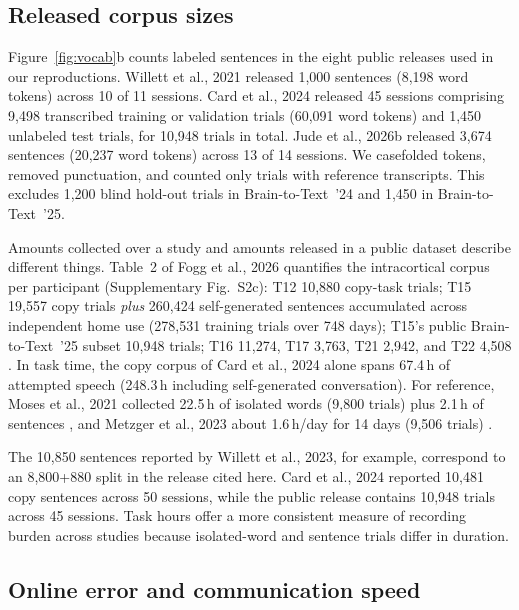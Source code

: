 \documentclass[11pt]{article}
\begin{document}
\subsection{Released corpus sizes}
\label{sec:corpus_size}

Figure~\ref{fig:vocab}b counts labeled sentences in the eight public
releases used in our reproductions. Willett et al., 2021 released
1{,}000 sentences (8{,}198 word tokens) across 10 of 11 sessions.
Card et al., 2024 released 45 sessions comprising 9{,}498 transcribed
training or validation trials (60{,}091 word tokens) and 1{,}450
unlabeled test trials, for 10{,}948 trials in total. Jude et al., 2026b
released 3{,}674 sentences (20{,}237 word tokens) across 13 of 14
sessions. We casefolded tokens, removed punctuation, and counted only
trials with reference transcripts. This excludes 1{,}200 blind
hold-out trials in Brain-to-Text~'24 and 1{,}450 in Brain-to-Text~'25.

Amounts collected over a study and amounts released in a public
dataset describe different things. Table~2 of Fogg et al., 2026
quantifies the intracortical corpus per participant
(Supplementary Fig.~S2c): T12
10{,}880 copy-task trials; T15 19{,}557 copy trials \emph{plus} 260{,}424
self-generated sentences accumulated across independent home use
(278{,}531 training trials over 748 days); T15's public
Brain-to-Text~'25 subset 10{,}948 trials; T16 11{,}274, T17 3{,}763,
T21 2{,}942, and T22 4{,}508 \cite{fogg2026}. In task time, the copy
corpus of Card et al., 2024 alone spans 67.4\,h of attempted speech
(248.3\,h including self-generated conversation). For
reference, Moses et al., 2021 collected 22.5\,h of isolated words
(9{,}800 trials) plus 2.1\,h of sentences \cite{moses2021}, and Metzger
et al., 2023 about 1.6\,h/day for 14 days (9{,}506 trials)
\cite{metzger2023}.

The 10{,}850 sentences reported by Willett et al., 2023, for example,
correspond to an 8{,}800+880 split in the release cited here. Card et al.,
2024 reported 10{,}481 copy sentences across 50 sessions, while the
public release contains 10{,}948 trials across 45 sessions. Task hours
offer a more consistent measure of recording burden across studies
because isolated-word and sentence trials differ in duration.

\subsection{Online error and communication speed}
\end{document}
